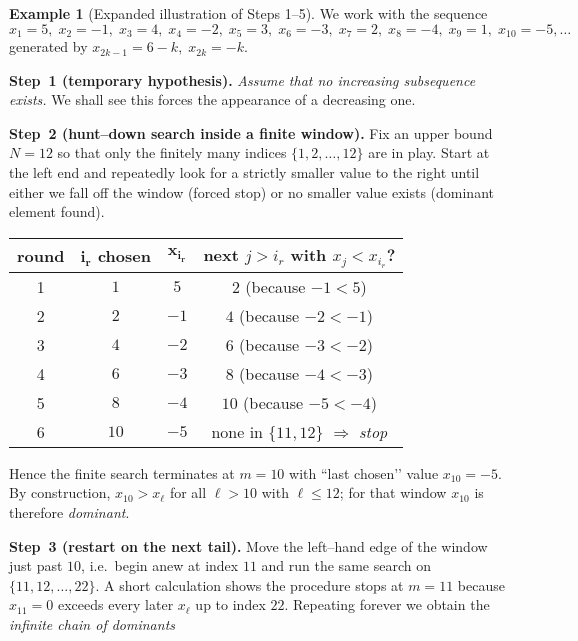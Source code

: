 \documentclass[12pt]{article}
\theoremstyle{definition} %
\newtheorem{example}{Example}
\theoremstyle{plain} %
\begin{document}
\begin{example}[Expanded illustration of Steps 1–5]\label{ex:long}
  We work with the sequence
  \[
        x_1=5,\;x_2=-1,\;x_3=4,\;x_4=-2,\;x_5=3,\;x_6=-3,\;
        x_7=2,\;x_8=-4,\;x_9=1,\;x_{10}=-5,\dots
  \]
  generated by
  \(x_{2k-1}=6-k,\;x_{2k}=-k\).
  
  \bigskip\noindent
  \textbf{Step 1 (temporary hypothesis).}
  \emph{Assume that no increasing subsequence exists.}
  We shall see this forces the appearance of a decreasing one.
  
  \bigskip\noindent
  \textbf{Step 2 (hunt–down search inside a finite window).}
  Fix an upper bound \(N=12\) so that only the finitely many indices
  \(\{1,2,\dots,12\}\) are in play.
  Start at the left end and repeatedly look for a strictly smaller
  value to the right until either we fall off the window (forced stop) or no
  smaller value exists (dominant element found).
  
  \begin{center}
  \begin{tabular}{|c|c|c|c|}
  \hline
  \textbf{round} & \(\boldsymbol{i_r}\) chosen & \(\boldsymbol{x_{i_r}}\) &  
  next \(j>i_r\) with \(x_j<x_{i_r}\)?\\
  \hline
  1 & \(1\) & \(5\)  & \(\boxed{2}\) (because \(-1<5\))\\
  2 & \(2\) & \(-1\) & \(\boxed{4}\) (because \(-2<-1\))\\
  3 & \(4\) & \(-2\) & \(\boxed{6}\) (because \(-3<-2\))\\
  4 & \(6\) & \(-3\) & \(\boxed{8}\) (because \(-4<-3\))\\
  5 & \(8\) & \(-4\) & \(\boxed{10}\) (because \(-5<-4\))\\
  6 & \(10\)& \(-5\)& none in \(\{11,12\}\) \(\Rightarrow\) \emph{stop}\\
  \hline
  \end{tabular}
  \end{center}
  
  \noindent
  Hence the finite search terminates at \(m=10\)
  with “last chosen’’ value \(x_{10}=-5\).
  By construction,
  \(x_{10}>x_\ell\) for all \(\ell>10\) with \(\ell\le12\);
  for that window \(x_{10}\) is therefore \emph{dominant}.
  
  \bigskip\noindent
  \textbf{Step 3 (restart on the next tail).}
  Move the left–hand edge of the window just past \(10\),
  i.e.\ begin anew at index \(11\) and run the same search
  on \(\{11,12,\dots,22\}\).
  A short calculation shows the procedure stops at \(m=11\)
  because \(x_{11}=0\) exceeds every later \(x_\ell\)
  up to index \(22\).
  Repeating forever we obtain the \emph{infinite chain of dominants}
  

\end{example}
\end{document}
